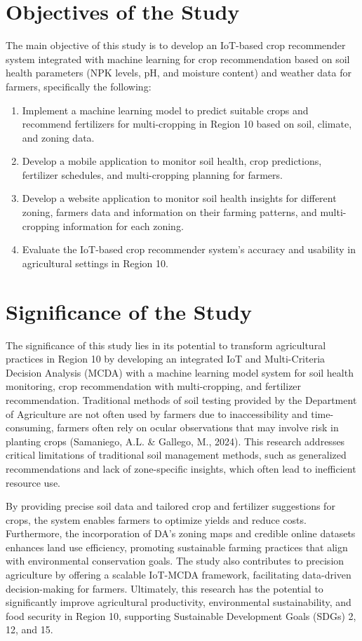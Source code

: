 \begin{doublespace}
\section{Objectives of the Study}

The main objective of this study is to develop an IoT-based crop recommender system integrated with machine learning for crop recommendation based on soil health parameters (NPK levels, pH, and moisture content) and weather data for farmers, specifically the following:

\begin{enumerate}
	\item Implement a machine learning model to predict suitable crops and recommend fertilizers for multi-cropping in Region 10 based on soil, climate, and zoning data.
	\item Develop a mobile application to monitor soil health, crop predictions, fertilizer schedules, and multi-cropping planning for farmers.
	\item Develop a website application to monitor soil health insights for different zoning, farmers data and information on their farming patterns, and multi-cropping information for each zoning.
	\item Evaluate the IoT-based crop recommender system’s accuracy and  usability in agricultural settings in Region 10.
\end{enumerate}

\section{Significance of the Study}

The significance of this study lies in its potential to transform agricultural practices in Region 10 by developing an integrated IoT and Multi-Criteria Decision Analysis (MCDA) with a machine learning model system for soil health monitoring, crop recommendation with multi-cropping, and fertilizer recommendation. Traditional methods of soil testing provided by the Department of Agriculture are not often used by farmers due to inaccessibility and time-consuming, farmers often rely on ocular observations that may involve risk in planting crops (Samaniego, A.L. \& Gallego, M., 2024). This research addresses critical limitations of traditional soil management methods, such as generalized recommendations and lack of zone-specific insights, which often lead to inefficient resource use.

By providing precise soil data and tailored crop and fertilizer suggestions for crops, the system enables farmers to optimize yields and reduce costs. Furthermore, the incorporation of DA’s zoning maps and credible online datasets enhances land use efficiency, promoting sustainable farming practices that align with environmental conservation goals. The study also contributes to precision agriculture by offering a scalable IoT-MCDA framework, facilitating data-driven decision-making for farmers. Ultimately, this research has the potential to significantly improve agricultural productivity, environmental sustainability, and food security in Region 10, supporting Sustainable Development Goals (SDGs) 2, 12, and 15.


\end{doublespace}
